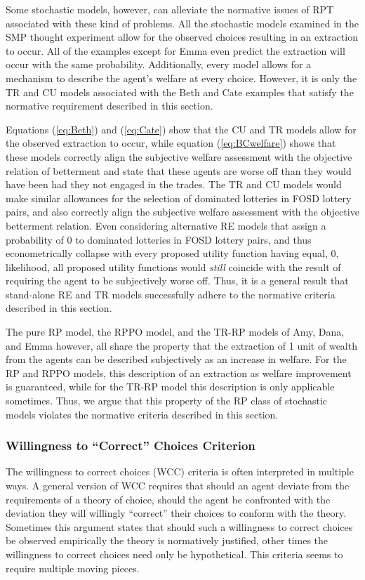 Some stochastic models, however, can alleviate the normative issues of RPT associated with these kind of problems.
All the stochastic models examined in the SMP thought experiment allow for the observed choices resulting in an extraction to occur.
All of the examples except for Emma even predict the extraction will occur with the same probability.
Additionally, every model allows for a mechanism to describe the agent's welfare at every choice.
However, it is only the TR and CU models associated with the Beth and Cate examples that satisfy the normative requirement described in this section.

Equations (\ref{eq:Beth}) and (\ref{eq:Cate}) show that the CU and TR models allow for the observed extraction to occur, while equation (\ref{eq:BCwelfare}) shows that these models correctly align the subjective welfare assessment with the objective relation of betterment and state that these agents are worse off than they would have been had they not engaged in the trades.
The TR and CU models would make similar allowances for the selection of dominated lotteries in FOSD lottery pairs, and also correctly align the subjective welfare assessment with the objective betterment relation.
Even considering alternative RE models that assign a probability of $0$ to dominated lotteries in FOSD lottery pairs, and thus econometrically collapse with every proposed utility function having equal, $0$, likelihood, all proposed utility functions would \textit{still} coincide with the result of requiring the agent to be subjectively worse off.
Thus, it is a general result that stand-alone RE and TR models successfully adhere to the normative criteria described in this section.

The pure RP model, the RPPO model, and the TR-RP models of Amy, Dana, and Emma however, all share the property that the extraction of 1 unit of wealth from the agents can be described subjectively as an increase in welfare.
For the RP and RPPO models, this description of an extraction as welfare improvement is guaranteed, while for the TR-RP model this description is only applicable sometimes.
Thus, we argue that this property of the RP class of stochastic models violates the normative criteria described in this section.


\subsubsection{Willingness to \enquote{Correct} Choices Criterion}

The willingness to correct choices (WCC) criteria is often interpreted in multiple ways.
A general version of WCC requires that should an agent deviate from the requirements of a theory of choice, should the agent be confronted with the deviation they will willingly \enquote{correct} their choices to conform with the theory.
Sometimes this argument states that should such a willingness to correct choices be observed empirically the theory is normatively justified, other times the willingness to correct choices need only be hypothetical.
This criteria seems to require multiple moving pieces. 

